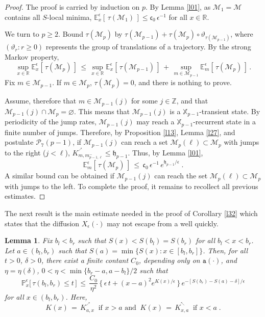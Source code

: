 \documentclass[reqno]{amsart}
\theoremstyle{plain}
\newtheorem{lemma}[theorem]{Lemma}
\theoremstyle{definition}
\newcommand{\mc}[1]{{\mathcal #1}}
\newcommand{\mf}[1]{{\mathfrak #1}}
\newcommand{\bb}[1]{{\mathbb #1}}
\newcommand{\ms}[1]{{\mathscr #1}}
\newcommand{\mtt}[1]{{\mathtt #1}}
\newcounter{as}[section]
\newcommand{\<}{\langle}
\renewcommand{\>}{\rangle}
\begin{document}
\begin{proof}
The proof is carried by induction on $p$. By Lemma \ref{l01}, as
$\ms M_1 = \mc M$ contains all $S$-local minima,
$\bb E_{x}^{\epsilon} [\, \tau (\ms M_1) \, ] \le \mf c_0 \,
\epsilon^{-1}$ for all $x\in\bb R$.

We turn to $p\ge 2$. Bound $\tau (\ms M_p)$ by
$\tau (\ms M_{p-1}) + \tau (\ms M_p) \circ \vartheta_{\tau (\ms
M_{p-1})}$, where $(\vartheta_r : r\ge 0)$ represents the group of
translations of a trajectory. By the strong Markov property,
\begin{equation*}
\sup_{x\in \bb R}
\bb E_{x}^{\epsilon} [\, \tau (\ms M_p) \, ]
\,\le\, \sup_{x\in \bb R}
\bb E_{x}^{\epsilon} [\, \tau (\ms M_{p-1}) \, ]
\,+\, \sup_{m\in \ms M_{p-1}}
\bb E_{m}^{\epsilon} [\, \tau (\ms M_p) \, ]
\,. 
\end{equation*}
Fix $m\in \ms M_{p-1}$. If $m\in \ms M_{p}$, $\tau (\ms
M_p)=0$, and there is nothing to prove.

Assume, therefore that $m\in \ms M_{p-1}(j)$ for some $j\in \bb Z$,
and that $\ms M_{p-1}(j) \cap \ms M_p = \varnothing$. This means that
$\ms M_{p-1}(j)$ is a $\bb X_{p-1}$-transient state. By periodicity of
the jump rates, $\ms M_{p-1}(j)$ may reach a $\bb X_{p-1}$-recurrent
state in a finite number of jumps.  Therefore, by Proposition
\ref{l13}, Lemma \ref{l27}, and postulate $\mc P_7(p-1)$, if
$\ms M_{p-1}(j)$ can reach a set $\ms M_p(\ell) \subset \ms M_p$ with
jumps to the right ($j<\ell$),
$K^{^\nearrow}_{m,m^-_{p-1,\ell}} \le \mf h_{p-1}$.  Thus, by Lemma
\ref{l01},
\begin{equation*}
\bb E_{m}^{\epsilon} [\, \tau (\ms M_p) \, ] \,\le\, \mf c_0\,
\epsilon^{-1}\, e^{\mf h_{p-1}/\epsilon}\;.
\end{equation*}
A similar bound can be obtained if $\ms M_{p-1}(j)$ can reach the set
$\ms M_p(\ell) \subset \ms M_p$ with jumps to the left.  To complete
the proof, it remains to recollect all previous estimates.
\end{proof}

The next result is the main estimate needed in the proof of Corollary
\ref{l32} which states that the diffusion $X_\epsilon(\cdot)$ may not
escape from a well quickly.

\begin{lemma}
\label{l31}
Fix $b_l < b_r$ such that $S(x) < S(b_l) = S(b_r)$ for all
$b_l<x<b_r$. Let $a\in (b_l, b_r)$ such that
$S(a) = \min \{S(x) : x\in [b_l,b_r]\}$.  Then, for all $t>0$,
$\delta>0$, there exist a finite contant $C_0$, depending only on
$\mtt a(\cdot)$, and $\eta = \eta(\delta)$,
$0<\eta < \min\{b_r-a, a-b_l\}/2$ such that
\begin{equation*}
\bb P_{x}^{\epsilon}
\big [\, \tau(b_l, b_r) \le t \,\big]
\,\le\, \frac{C_0}{\eta^2} \, \big\{\, \epsilon\, t + (x-a)^2
e^{K(x)/\epsilon} \, \big\}\, e^{- [S(b_r) - S(a) - \delta]/\epsilon}
\end{equation*}
for all $x\in (b_l, b_r)$. Here,
\begin{equation*}
K(x) \,=\, K^{^\nearrow}_{a,x} \;\;\text{if $x>a$ and}\;\;
K(x) \,=\, K^{^\nwarrow}_{x,a} \;\;\text{if $x<a$} \;.
\end{equation*}
\end{lemma} 
\end{document}
